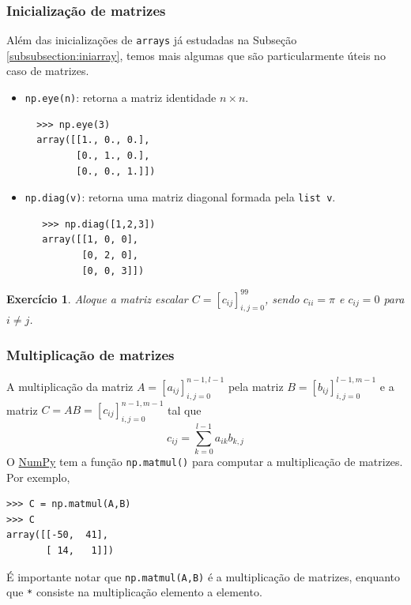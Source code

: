 \documentclass[12pt]{article}
\newtheorem{exr}{Exercício}[section]
\begin{document}
\subsubsection{Inicialização de matrizes}

Além das inicializações de \lstinline+arrays+ já estudadas na Subseção \ref{subsubsection:iniarray}, temos mais algumas que são particularmente úteis no caso de matrizes.
\begin{itemize}
\item \lstinline+np.eye(n)+: retorna a matriz identidade $n\times n$.
  \begin{lstlisting}
  >>> np.eye(3)
  array([[1., 0., 0.],
         [0., 1., 0.],
         [0., 0., 1.]])
   \end{lstlisting}
 \item \lstinline+np.diag(v)+: retorna uma matriz diagonal formada pela \lstinline+list v+.
   \begin{lstlisting}
   >>> np.diag([1,2,3])
   array([[1, 0, 0],
          [0, 2, 0],
          [0, 0, 3]])
   \end{lstlisting}
 \end{itemize}

 \begin{exr}
   Aloque a matriz escalar $C = [c_{ij}]_{i,j=0}^{99}$, sendo $c_{ii}=\pi$ e $c_{ij}=0$ para $i\neq j$.
 \end{exr}

\subsubsection{Multiplicação de matrizes}

A multiplicação da matriz $A = [a_{ij}]_{i,j=0}^{n-1,l-1}$ pela matriz $B = [b_{ij}]_{i,j=0}^{l-1,m-1}$ e a matriz $C = AB = [c_{ij}]_{i,j=0}^{n-1,m-1}$ tal que
\begin{equation}
  c_{ij} = \sum_{k=0}^{l-1} a_{ik}b_{k,j}
\end{equation}
O \href{https://numpy.org/}{NumPy} tem a função \lstinline+np.matmul()+ para computar a multiplicação de matrizes. Por exemplo,
\begin{lstlisting}
>>> C = np.matmul(A,B)
>>> C
array([[-50,  41],
       [ 14,   1]])
\end{lstlisting}

\begin{obs}
  É importante notar que \lstinline+np.matmul(A,B)+ é a multiplicação de matrizes, enquanto que \lstinline+*+ consiste na multiplicação elemento a elemento.
\end{obs}
\end{document}
